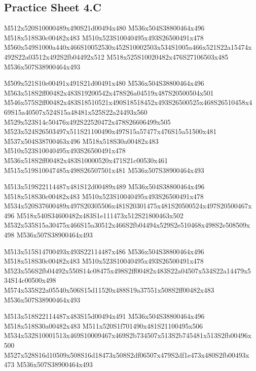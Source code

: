 \documentclass{article}
\begin{document}
\subsection{Practice Sheet 4.C}

\begin{multicols}{5}
\begin{center}
M512x520S10000489x490S21d00494x480 %
M536x504S38800464x496 %
M518x518S30c00482x483 %
M510x523S10040495x493S26500491x478 %
M560x549S1000a440x466S10052530x452S10002503x534S1005a466x521S22a15474x492S22a03512x492S2fb04492x512 %
M518x525S10020482x476S27106503x485 %
M536x507S38900464x493 %
\vfil
\columnbreak

M509x521S10e00491x491S21d00491x480 %
M536x504S38800464x496 %
M563x518S2ff00482x483S19200542x478S26a04519x487S20500504x501 %
M546x575S2ff00482x483S18510521x490S18518452x493S26500525x468S26510458x469S15a40507x524S15a48481x525S22a24493x560 %
M529x523S14c50476x492S22520472x478S26606499x505 %
M523x524S26503497x511S21100490x497S15a57477x476S15a51500x481 %
M537x504S38700463x496 %
M518x518S30a00482x483 %
M510x523S10040495x493S26500491x478 %
M536x518S2ff00482x483S10000520x471S21c00530x461 %
M515x519S10047485x498S26507501x481 %
M536x507S38900464x493 %
\vfil
\columnbreak

M513x519S22114487x481S12d00489x489 %
M536x504S38800464x496 %
M518x518S30c00482x483 %
M510x523S10040495x493S26500491x478 %
M534x520S37600489x497S20305506x481S20301475x481S20500524x497S20500467x496 %
M518x540S34600482x483S1e111473x512S21800463x502 %
M532x535S15a30475x466S15a30512x466S2fb04494x529S2e510468x498S2e508509x498 %
M536x507S38900464x493 %
\vfil
\columnbreak

M513x515S14700493x493S22114487x486 %
M536x504S38800464x496 %
M518x518S30c00482x483 %
M510x523S10040495x493S26500491x478 %
M523x556S2fb04492x550S14c08475x498S2ff00482x483S22a04507x534S22a14479x534S14c00500x498 %
M574x535S22a05540x506S15d11520x488S19a37551x508S2ff00482x483 %
M536x507S38900464x493 %
\vfil
\columnbreak

M513x518S22114487x483S15d00494x491 %
M536x504S38800464x496 %
M518x518S30a00482x483 %
M511x520S1f701490x481S21100495x506 %
M534x532S10001513x469S10009467x469S2b734507x513S2b745481x513S2fb00496x500 %
M527x528S16d10509x508S16d18473x508S2df06507x479S2df1e473x480S2fb00493x473 %
M536x507S38900464x493 %
\vfil

\end{center}
\end{multicols}
\end{document}

